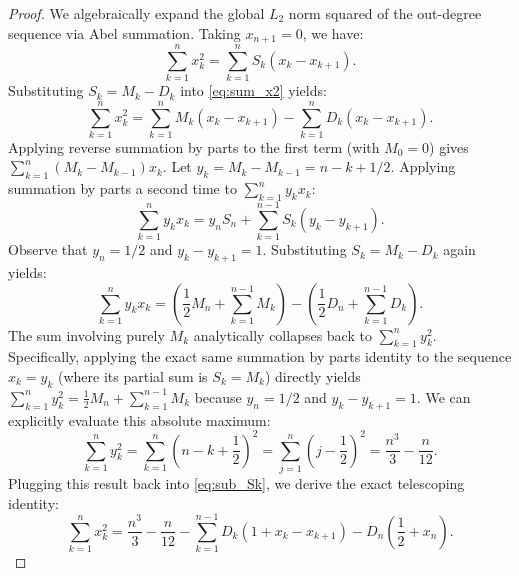 \documentclass[a4paper]{amsart}
\begin{document}
\begin{proof}
We algebraically expand the global $L_2$ norm squared of the out-degree sequence via Abel summation.
Taking $x_{n+1} = 0$, we have:
\begin{equation} \label{eq:sum_x2}
\sum_{k=1}^n x_k^2 = \sum_{k=1}^n S_k (x_k - x_{k+1}).
\end{equation}
Substituting $S_k = M_k - D_k$ into \eqref{eq:sum_x2} yields:
\begin{equation} \label{eq:sub_Sk}
\sum_{k=1}^n x_k^2 = \sum_{k=1}^n M_k (x_k - x_{k+1}) - \sum_{k=1}^n D_k (x_k - x_{k+1}).
\end{equation}
Applying reverse summation by parts to the first term (with $M_0 = 0$) gives $\sum_{k=1}^n (M_k - M_{k-1}) x_k$.
Let $y_k = M_k - M_{k-1} = n - k + 1/2$.
Applying summation by parts a second time to $\sum_{k=1}^n y_k x_k$:
\begin{equation}
\sum_{k=1}^n y_k x_k = y_n S_n + \sum_{k=1}^{n-1} S_k (y_k - y_{k+1}).
\end{equation}
Observe that $y_n = 1/2$ and $y_k - y_{k+1} = 1$.
Substituting $S_k = M_k - D_k$ again yields:
\begin{equation} \label{eq:yk_substitution}
\sum_{k=1}^n y_k x_k = \left( \frac{1}{2} M_n + \sum_{k=1}^{n-1} M_k \right) - \left( \frac{1}{2} D_n + \sum_{k=1}^{n-1} D_k \right).
\end{equation}
The sum involving purely $M_k$ analytically collapses back to $\sum_{k=1}^n y_k^2$.
Specifically, applying the exact same summation by parts identity to the sequence $x_k = y_k$ (where its partial sum is $S_k = M_k$) directly yields $\sum_{k=1}^n y_k^2 = \frac{1}{2} M_n + \sum_{k=1}^{n-1} M_k$ because $y_n = 1/2$ and $y_k - y_{k+1} = 1$.
We can explicitly evaluate this absolute maximum:
\begin{equation}
\sum_{k=1}^n y_k^2 = \sum_{k=1}^n \left(n - k + \frac{1}{2}\right)^2 = \sum_{j=1}^n \left(j - \frac{1}{2}\right)^2 = \frac{n^3}{3} - \frac{n}{12}.
\end{equation}
Plugging this result back into \eqref{eq:sub_Sk}, we derive the exact telescoping identity:
\begin{equation} \label{eq:exact_identity}
\sum_{k=1}^n x_k^2 = \frac{n^3}{3} - \frac{n}{12} - \sum_{k=1}^{n-1} D_k (1 + x_k - x_{k+1}) - D_n \left( \frac{1}{2} + x_n \right).
\end{equation}


\end{proof}
\end{document}
